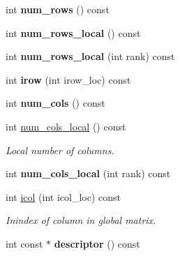 \begin{DoxyCompactItemize}
\item 
\hypertarget{classsddk_1_1dmatrix_a17dfeca88ea7b54b0fd596571ce5ee09}{}int {\bfseries num\+\_\+rows} () const \label{classsddk_1_1dmatrix_a17dfeca88ea7b54b0fd596571ce5ee09}

\item 
\hypertarget{classsddk_1_1dmatrix_af0a18f1eb70428372ad0f15be00c3eec}{}int {\bfseries num\+\_\+rows\+\_\+local} () const \label{classsddk_1_1dmatrix_af0a18f1eb70428372ad0f15be00c3eec}

\item 
\hypertarget{classsddk_1_1dmatrix_ab310a8aede96537492a68c1d6ed50d6b}{}int {\bfseries num\+\_\+rows\+\_\+local} (int rank) const \label{classsddk_1_1dmatrix_ab310a8aede96537492a68c1d6ed50d6b}

\item 
\hypertarget{classsddk_1_1dmatrix_a196179a75951526ffe100d584464223a}{}int {\bfseries irow} (int irow\+\_\+loc) const \label{classsddk_1_1dmatrix_a196179a75951526ffe100d584464223a}

\item 
\hypertarget{classsddk_1_1dmatrix_a0713ede16570f7051826182f78126b38}{}int {\bfseries num\+\_\+cols} () const \label{classsddk_1_1dmatrix_a0713ede16570f7051826182f78126b38}

\item 
int \hyperlink{classsddk_1_1dmatrix_a73a71bba8a42d6b9db4e1ce3627fd3b2}{num\+\_\+cols\+\_\+local} () const 
\begin{DoxyCompactList}\small\item\em Local number of columns. \end{DoxyCompactList}\item 
\hypertarget{classsddk_1_1dmatrix_afa65655a3301ebcc9afa2fcc93d1c13b}{}int {\bfseries num\+\_\+cols\+\_\+local} (int rank) const \label{classsddk_1_1dmatrix_afa65655a3301ebcc9afa2fcc93d1c13b}

\item 
int \hyperlink{classsddk_1_1dmatrix_a6b4465a226fe4a0074a6a8f042bdde63}{icol} (int icol\+\_\+loc) const 
\begin{DoxyCompactList}\small\item\em Inindex of column in global matrix. \end{DoxyCompactList}\item 
\hypertarget{classsddk_1_1dmatrix_a67e037237068177c63d032c725841c80}{}int const $\ast$ {\bfseries descriptor} () const \label{classsddk_1_1dmatrix_a67e037237068177c63d032c725841c80}


\end{DoxyCompactItemize}
